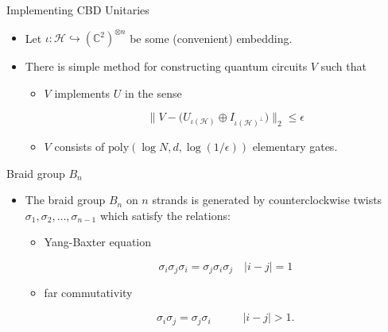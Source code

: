 \documentclass[slideColor]{prosper}
\renewcommand{\>}{\rangle}
\newcommand{\<}{\langle}
\newcommand{\C}{{\mathbb C}}
\newcommand{\cH}{{\mathcal H}}
\begin{document}

\begin{slide}{Implementing CBD Unitaries}

\begin{itemize}
\item Let $\iota : \cH \hookrightarrow (\C^2)^{\otimes n}$ be some (convenient) embedding.

\bigskip
\item There is simple method for constructing quantum circuits $V$ such that 

\bigskip
\begin{itemize}
\item $V$ implements $U$ in the sense

\[
\Big\| V - \big( U_{\iota(\cH)} \oplus I_{\iota(\cH)^\perp} \big) \Big\|_2 \le \epsilon
\]

\bigskip
\item $V$ consists of $\mathrm{poly}(\log N, d, \log(1/\epsilon))$ elementary gates.
\end{itemize}
\end{itemize}

\end{slide}


\begin{slide}{Braid group $B_n$}

\begin{itemize}
\item The braid group $B_n$ on $n$ strands is generated by counterclockwise twists $\sigma_1,\sigma_2,\ldots,\sigma_{n-1}$ which satisfy the relations:

\bigskip
\begin{itemize}
\item Yang-Baxter equation

\[
\sigma_i \sigma_j \sigma_i = \sigma_j \sigma_i \sigma_j \quad |i-j|=1
\]

\bigskip
\item far commutativity 

\[
\sigma_i \sigma_j = \sigma_j \sigma_i \;\;\;\quad\quad |i-j|>1.
\]
\end{itemize}

\end{itemize}

\end{slide}

\end{document}
